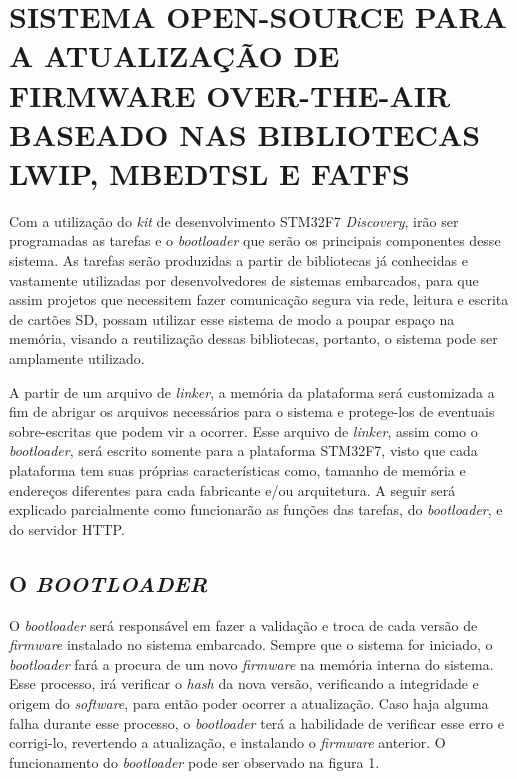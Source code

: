 
\chapter{SISTEMA OPEN-SOURCE PARA A ATUALIZAÇÃO DE FIRMWARE OVER-THE-AIR BASEADO NAS BIBLIOTECAS LWIP, MBEDTSL E FATFS}
\label{chap:metodologia}
Com a utilização do \textit{kit} de desenvolvimento STM32F7 \textit{Discovery}, irão ser programadas as tarefas e o \textit{bootloader} que serão os principais componentes desse sistema. As tarefas serão produzidas a partir de bibliotecas já conhecidas e vastamente utilizadas por desenvolvedores de sistemas embarcados, para que assim projetos que necessitem fazer comunicação segura via rede, leitura e escrita de cartões SD, possam utilizar esse sistema de modo a poupar espaço na memória, visando a reutilização dessas bibliotecas, portanto, o sistema pode ser amplamente utilizado.


A partir de um arquivo de \textit{linker}, a memória da plataforma será customizada a fim de abrigar os arquivos necessários para o sistema e protege-los de eventuais sobre-escritas que podem vir a ocorrer. Esse arquivo de \textit{linker}, assim como o \textit{bootloader}, será escrito somente para a plataforma STM32F7, visto que cada plataforma tem suas próprias características como, tamanho de memória e endereços diferentes para cada fabricante e/ou arquitetura. A seguir será explicado parcialmente como funcionarão as funções das tarefas, do \textit{bootloader}, e do servidor HTTP.

\section{O \textit{BOOTLOADER}}
\label{sec:Bootloader}

O \textit{bootloader} será responsável em fazer a validação e troca de cada versão de \textit{firmware} instalado no sistema embarcado. Sempre que o sistema for iniciado, o \textit{bootloader} fará a procura de um novo \textit{firmware} na memória interna do sistema. Esse processo, irá verificar o \textit{hash} da nova versão, verificando a integridade e origem do \textit{software}, para então poder ocorrer a atualização. Caso haja alguma falha durante esse processo, o \textit{bootloader} terá a habilidade de verificar esse erro e corrigi-lo, revertendo a atualização, e instalando o \textit{firmware} anterior. O funcionamento do \textit{bootloader} pode ser observado na figura 1.

